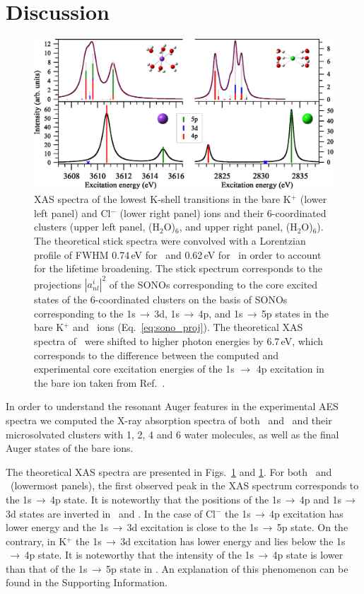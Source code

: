 \section{Discussion}\label{sec:disc}

\begin{figure}
\centering
\includegraphics[scale=0.6]{figures/xas_spectra.eps}
\caption{
XAS spectra of the lowest K-shell transitions in the bare K$^{+}$ (lower left panel) and Cl$^{-}$ (lower right panel) ions and their 6-coordinated clusters (upper left panel, \ki(H$_2$O)$_6$, and upper right panel, \cli(H$_2$O)$_6$). The theoretical stick spectra were convolved with a Lorentzian profile of FWHM 0.74\,eV for \ki~and 0.62\,eV for \cli~in order to account for the lifetime broadening. The stick spectrum corresponds to the projections $|a_{nl}^{i}|^2$ of the SONOs corresponding to the core excited states of the 6-coordinated clusters on the basis of SONOs corresponding to the 1s$\,\rightarrow\,$3d, 1s$\,\rightarrow\,$4p, and 1s$\,\rightarrow\,$5p states in the bare K$^+$ and \cli~ions (Eq.\ \ref{eq:sono_proj}). The theoretical XAS spectra of \ki~were shifted to higher photon energies by 6.7\,eV, which corresponds to the difference between the computed and experimental core excitation energies of the 1s $\rightarrow$ 4p excitation in the bare ion taken from Ref.\ \citep{hertlein06:062715}.}
\label{fg:xas_kcl}
\end{figure}


In order to understand the resonant Auger features in the experimental AES spectra we computed the X-ray absorption spectra of both \ki~and \cli~and their microsolvated clusters with 1, 2, 4 and 6 water molecules, as well as the final Auger states of the bare ions.


The theoretical XAS spectra are presented in Figs.\ \ref{fg:xas_kcl} and \ref{fg:xas_kcl}. For both \ki~and \cli~(lowermost panels), the first observed peak in the XAS spectrum corresponds to the 1s$\,\rightarrow\,$4p state. It is noteworthy that the positions of the 1s$\,\rightarrow\,$4p and 1s$\,\rightarrow\,$3d states are inverted in \ki~and \cli. In the case of Cl$^{-}$ the 1s$\,\rightarrow\,$4p excitation has lower energy and the 1s$\,\rightarrow\,$3d excitation is close to the 1s$\,\rightarrow\,$5p state. On the contrary, in K$^{+}$ the 1s$\,\rightarrow\,$3d excitation has lower energy and lies below the 1s$\,\rightarrow\,$4p state. It is noteworthy that the intensity of the 1s$\,\rightarrow\,$4p state is lower than that of the 1s$\,\rightarrow\,$5p state in \cli. An explanation of this phenomenon can be found in the Supporting Information.


